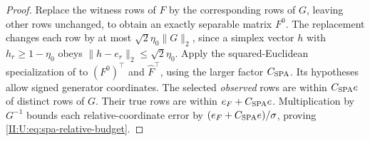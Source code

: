 \begin{proof}
Replace the witness rows of $F$ by the corresponding rows of $G$,
leaving other rows unchanged, to obtain an exactly separable matrix
$F^0$. The replacement changes each row by at most
$\sqrt2\eta_0\|G\|_2$, since a simplex vector $h$ with
$h_r\ge1-\eta_0$ obeys $\|h-e_r\|_2\le\sqrt2\eta_0$.
Apply the squared-Euclidean specialization of
\citet[Theorem 3 and Remark 2]{gillis2014} to $(F^0)^\top$ and
$\widehat F^\top$, using the larger factor $C_{\rm SPA}$.
Its hypotheses allow signed generator coordinates. The selected
\emph{observed} rows are within $C_{\rm SPA}e$ of distinct rows of $G$.
Their true rows are within $e_F+C_{\rm SPA}e$. Multiplication by
$G^{-1}$ bounds each relative-coordinate error by
$(e_F+C_{\rm SPA}e)/\sigma$, proving \eqref{II:U:eq:spa-relative-budget}.
\end{proof}
